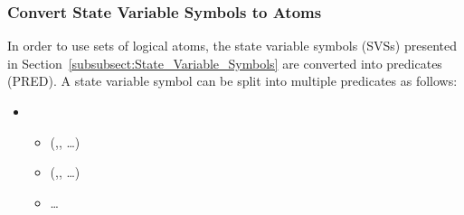\subsubsection{Convert State Variable Symbols to Atoms}
In order to use sets of logical atoms, the state variable symbols (SVSs) presented in Section~\ref{subsubsect:State_Variable_Symbols} are converted into predicates (PRED). A state variable symbol can be split into multiple predicates as follows:
\begin{itemize}
 \item {}
  \begin{itemize}
  \item {} (,, \ldots)
  \item {} (,, \ldots)
  \item \ldots
  \end{itemize}
\end{itemize}


